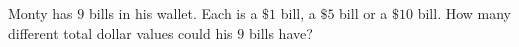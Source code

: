 Monty has $9$ bills in his wallet. Each is a $\$1$ bill, a $\$5$ bill or a $\$10$ bill. How many different total dollar values could his $9$ bills have?
